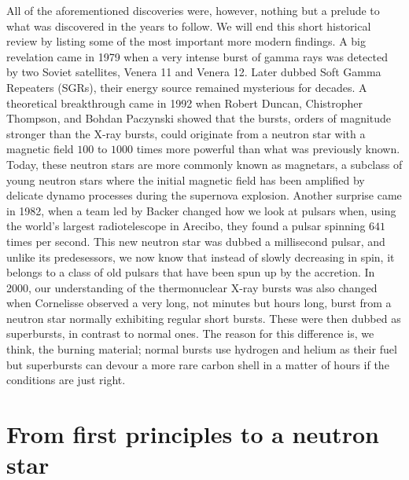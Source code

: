 All of the aforementioned discoveries were, however, nothing but a prelude to what was discovered in the years to follow.
We will end this short historical review by listing some of the most important more modern findings.
A big revelation came in 1979 when a very intense burst of gamma rays was detected by two Soviet satellites, Venera 11 and Venera 12.\cite{MGI79}
Later dubbed Soft Gamma Repeaters (SGRs), their energy source remained mysterious for decades.
A theoretical breakthrough came in 1992 when Robert Duncan, Chistropher Thompson, and Bohdan Paczynski showed that the bursts, orders of magnitude stronger than the X-ray bursts, could originate from a neutron star with a magnetic field $100$ to $1000$ times more powerful than what was previously known.\cite{DT92}
Today, these neutron stars are more commonly known as magnetars, a subclass of young neutron stars where the initial magnetic field has been amplified by delicate dynamo processes during the supernova explosion.
Another surprise came in 1982, when a team led by Backer changed how we look at pulsars when, using the world's largest radiotelescope in Arecibo, they found a pulsar spinning $641$ times per second.\cite{BKH82}
This new neutron star was dubbed a millisecond pulsar, and unlike its predesessors, we now know that instead of slowly decreasing in spin, it belongs to a class of old pulsars that have been spun up by the accretion.
In 2000, our understanding of the thermonuclear X-ray bursts was also changed when Cornelisse observed a very long, not minutes but hours long, burst from a neutron star normally exhibiting regular short bursts.\cite{CHK00}
These were then dubbed as superbursts, in contrast to normal ones.
The reason for this difference is, we think, the burning material;
normal bursts use hydrogen and helium as their fuel but superbursts can devour a more rare carbon shell in a matter of hours if the conditions are just right.



\section{From first principles to a neutron star}

